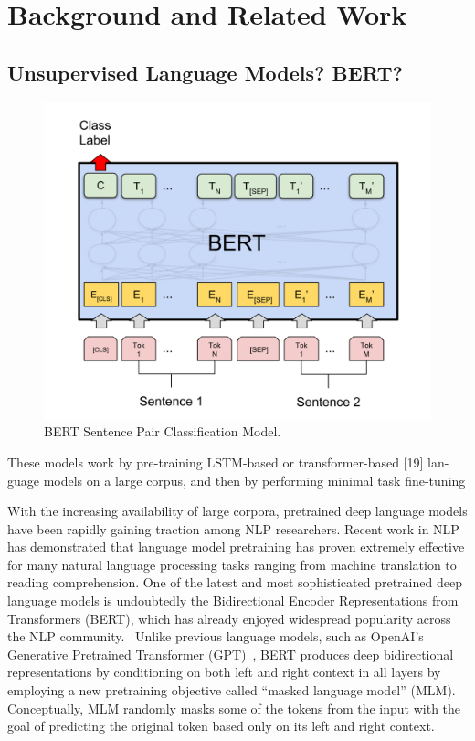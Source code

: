 \chapter{Background and Related Work}

\section{Unsupervised Language Models? BERT?}

\begin{figure}[b!]
\centering
  \includegraphics[width=5in]{classification.png}
\caption{BERT Sentence Pair Classification Model.}
\label{fig:bert}
\end{figure}


These models
work by pre-training LSTM-based or transformer-based [19] lan-guage models on a large corpus, and then by performing minimal
task fine-tuning

With the increasing availability of large corpora, pretrained deep language models have been rapidly gaining traction among NLP researchers.
Recent work in NLP has demonstrated that language model pretraining has proven extremely effective for many natural language processing tasks ranging from machine translation to reading comprehension.
One of the latest and most sophisticated pretrained deep language models is undoubtedly the Bidirectional Encoder Representations from Transformers (BERT), which has already enjoyed widespread popularity across the NLP community.~\cite{devlin2018bert}
Unlike previous language models, such as OpenAI's Generative Pretrained Transformer (GPT)~\cite{radford2019language}, BERT produces deep bidirectional representations by conditioning on both left and right context in all layers by employing a new pretraining objective called ``masked language model'' (MLM).
Conceptually, MLM randomly masks some of the tokens from the input with the goal of predicting the original token based only on its left and right context.

